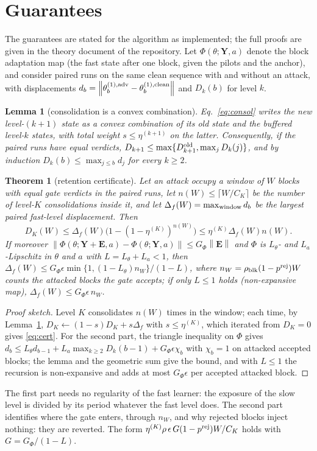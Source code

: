 \documentclass[journal]{IEEEtran}
\newtheorem{theorem}{Theorem}
\newtheorem{lemma}{Lemma}
\newcommand{\norm}[1]{\left\lVert #1 \right\rVert}
\begin{document}
\section{Guarantees}\label{sec:theory}
The guarantees are stated for the algorithm as implemented; the full proofs are given in
the theory document of the repository. Let $\Phi(\theta;\bm Y,a)$ denote the block
adaptation map (the fast state after one block, given the pilots and the anchor), and
consider paired runs on the same clean sequence with and without an attack, with
displacements $d_b=\norm{\theta^{(1),\rm adv}_b-\theta^{(1),\rm clean}_b}$ and $D_k(b)$ for
level $k$.

\begin{lemma}[consolidation is a convex combination]\label{lem:convex}
Eq.~\eqref{eq:consol} writes the new level-$(k{+}1)$ state as a convex combination of its
old state and the buffered level-$k$ states, with total weight $s\le\eta^{(k+1)}$ on the
latter. Consequently, if the paired runs have equal verdicts, $D_{k+1}\le\max\{D_{k+1}^{\rm
old},\max_j D_k(j)\}$, and by induction $D_k(b)\le\max_{j\le b}d_j$ for every $k\ge2$.
\end{lemma}
\begin{theorem}[retention certificate]\label{thm:cert}
Let an attack occupy a window of $W$ blocks with equal gate verdicts in the paired runs,
let $n(W)\le\lceil W/C_K\rceil$ be the number of level-$K$ consolidations inside it, and
let $\Delta_f(W)=\max_{\rm window}d_b$ be the largest paired fast-level displacement. Then
\begin{equation}\label{eq:cert}
D_K(W)\le\Delta_f(W)\big(1-(1-\eta^{(K)})^{n(W)}\big)\le\eta^{(K)}\Delta_f(W)n(W).
\end{equation}
If moreover $\norm{\Phi(\theta;\bm Y+\bm E,a)-\Phi(\theta;\bm Y,a)}\le G_\Phi\norm{\bm E}$ and
$\Phi$ is $L_\theta$- and $L_a$-Lipschitz in $\theta$ and $a$ with $L=L_\theta+L_a<1$, then
$\Delta_f(W)\le G_\Phi\epsilon\min\{1,(1-L_\theta)n_W\}/(1-L)$, where $n_W=\rho_{\rm
blk}(1-p^{\rm rej})W$ counts the attacked blocks the gate accepts; if only $L\le1$ holds
(non-expansive map), $\Delta_f(W)\le G_\Phi\epsilon\,n_W$.
\end{theorem}
\begin{proof}[Proof sketch]
Level $K$ consolidates $n(W)$ times in the window; each time, by Lemma~\ref{lem:convex},
$D_K\leftarrow(1-s)D_K+s\Delta_f$ with $s\le\eta^{(K)}$, which iterated from $D_K=0$ gives
\eqref{eq:cert}. For the second part, the triangle inequality on $\Phi$ gives $d_b\le
L_\theta d_{b-1}+L_a\max_{k\ge2}D_k(b-1)+G_\Phi\epsilon\chi_b$ with $\chi_b=1$ on attacked
accepted blocks; the lemma and the geometric sum give the bound, and with $L\le1$ the
recursion is non-expansive and adds at most $G_\Phi\epsilon$ per accepted attacked block.
\end{proof}
The first part needs no regularity of the fast learner: the exposure of the slow level
is divided by its period whatever the fast level does. The second part identifies where
the gate enters, through $n_W$, and why rejected blocks inject nothing: they are reverted.
The form $\eta^{(K)}\rho\,\epsilon\,G(1-p^{\rm rej})W/C_K$ holds with $G=G_\Phi/(1-L)$.
\end{document}
